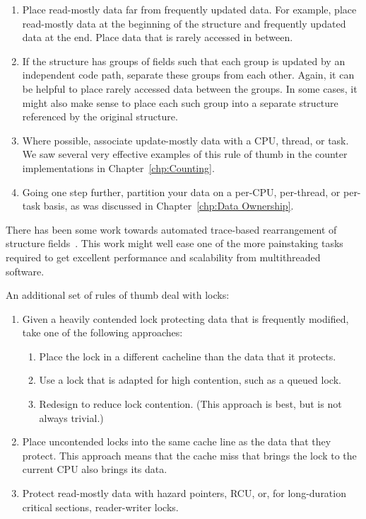 \begin{enumerate}
\item	Place read-mostly data far from frequently updated data.
	For example, place read-mostly data at the beginning of the
	structure and frequently updated data at the end.
	Place data that is rarely accessed in between.
\item	If the structure has groups of fields such that each group is
	updated by an independent code path, separate these groups
	from each other.
	Again, it can be helpful to place rarely accessed data
	between the groups.
	In some cases, it might also make sense to place each such group
	into a separate structure referenced by the original structure.
\item	Where possible, associate update-mostly data with a CPU, thread,
	or task.
	We saw several very effective examples of this rule of thumb
	in the counter implementations in
	Chapter~\ref{chp:Counting}.
\item	Going one step further, partition your data on a per-CPU,
	per-thread, or per-task basis, as was discussed in
	Chapter~\ref{chp:Data Ownership}.
\end{enumerate}

There has been some work towards automated trace-based rearrangement
of structure
fields~\cite{Golovanevsky:2010:TDL:2174824.2174835}.
This work might well ease one of the more painstaking tasks
required to get excellent performance and scalability from
multithreaded software.

An additional set of rules of thumb deal with locks:

\begin{enumerate}
\item	Given a heavily contended lock protecting data that is
	frequently modified, take one of the following approaches:
	\begin{enumerate}
	\item	Place the lock in a different cacheline than the data
		that it protects.
	\item	Use a lock that is adapted for high contention, such
		as a queued lock.
	\item	Redesign to reduce lock contention.
		(This approach is best, but is not always trivial.)
	\end{enumerate}
\item	Place uncontended locks into the same cache line as the data
	that they protect.
	This approach means that the cache miss that brings the
	lock to the current CPU also brings its data.
\item	Protect read-mostly data with hazard pointers, RCU, or, for
	long-duration critical sections, reader-writer locks.
\end{enumerate}

